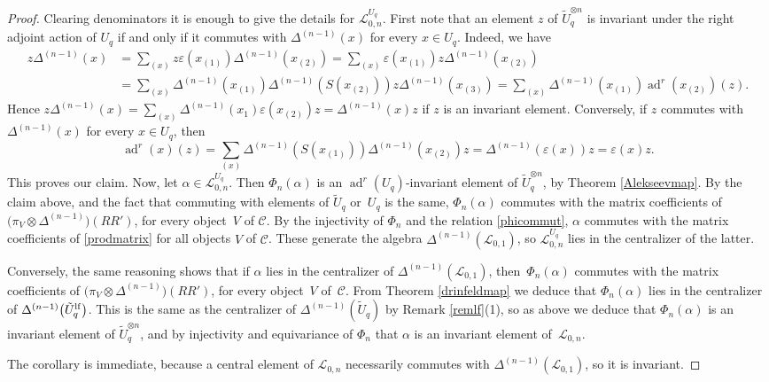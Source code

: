 \documentclass[pdftex]{sigma}%
\numberwithin{equation}{section}
\numberwithin{figure}{section}
\newcommand{\Ll}{{\mathcal L}}
\begin{document}
\begin{proof} Clearing denominators it is enough to give the details for $\Ll_{0,n}^{U_q}$. First note that an element $z$ of $\tilde U_q^{ \otimes n}$ is invariant under the right adjoint action of $U_q$ if and only if it commutes with $ \Delta^{(n-1)}(x)$ for every $x\in U_q$. Indeed, we have
\begin{align*}
z\Delta^{(n-1)}(x) & = \sum_{(x)} z \varepsilon(x_{(1)})\Delta^{(n-1)}(x_{(2)}) = \sum_{(x)} \varepsilon(x_{(1)}) z \Delta^{(n-1)}(x_{(2)})
\\
& =\! \sum_{(x)} \Delta^{(n-1)}(x_{(1)})\Delta^{(n-1)}( S(x_{(2)})) z \Delta^{(n-1)}(x_{(3)})
=\! \sum_{(x)}\!\Delta^{(n-1)}(x_{(1)}) \operatorname{ad}^r(x_{(2)})(z).
\end{align*}
Hence $\textstyle z\Delta^{(n-1)}(x) = \sum_{(x)} \Delta^{(n-1)}(x_{1}) \varepsilon(x_{(2)}) z = \Delta^{(n-1)}(x)z$ if $z$ is an invariant element. Conversely, if $z$ commutes with $\Delta^{(n-1)}(x)$ for every $x\in U_q$, then
\[
\operatorname{ad}^r(x)(z) = \sum_{(x)} \Delta^{(n-1)}( S(x_{(1)})) \Delta^{(n-1)}(x_{(2)}) z = \Delta^{(n-1)}(\varepsilon(x)) z = \varepsilon(x) z.
\]
This proves our claim. Now, let $\alpha\in \Ll_{0,n}^{U_q}$. Then $\Phi_n(\alpha)$ is an $\operatorname{ad}^r(U_q)$-invariant element of $\tilde U_q^{\otimes n}$, by Theorem \ref{Alekseevmap}. By the claim above, and the fact that commuting with elements of $\tilde U_q$ or~$U_q$ is the same, $\Phi_n(\alpha)$ commutes with the matrix coefficients of $\big(\pi_V \otimes \Delta^{(n-1)}\big)(RR')$, for every object~$V$ of $\mathcal{C}$. By the injectivity of $\Phi_n$ and the relation \eqref{phicommut}, $\alpha$ commutes with the matrix coefficients of \eqref{prodmatrix} for all objects $V$ of $\mathcal{C}$. These generate the algebra $\Delta^{(n-1)}(\Ll_{0,1})$, so $\Ll_{0,n}^{U_q}$ lies in the centralizer of the latter.

{\sloppy
Conversely, the same reasoning shows that if $\alpha$ lies in the centralizer of $\Delta^{(n-1)}(\Ll_{0,1})$, then~$\Phi_n(\alpha)$ commutes with the matrix coefficients of $\big(\pi_V \otimes \Delta^{(n-1)}\big)(RR')$, for every object~$V$ of~$\mathcal{C}$. From Theorem \ref{drinfeldmap} we deduce that $\Phi_n(\alpha)$ lies in the centralizer of $\Delta^{(n-1)}\big(\tilde U_q^{\rm lf}\big)$. This is the same as the centralizer of $\Delta^{(n-1)}(\tilde U_q)$ by Remark \ref{remlf}(1), so as above we deduce that $\Phi_n(\alpha)$ is an invariant element of $\tilde U_q^{\otimes n}$, and by injectivity and equivariance of $\Phi_n$ that $\alpha$ is an invariant element of~$\Ll_{0,n}$.

}

The corollary is immediate, because a central element of $\Ll_{0,n}$ necessarily commutes with $\Delta^{(n-1)}(\Ll_{0,1})$, so it is invariant.\end{proof}
\end{document}
